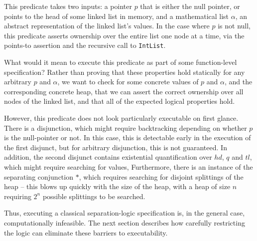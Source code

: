 This predicate takes two inputs: a pointer $p$ that is either the null pointer, or points to the head of some linked list in memory, and a mathematical list $\alpha$, an abstract representation of the linked list's values. In the case where $p$ is not null, this predicate asserts ownership over the entire list one node at a time, via the points-to assertion and the recursive call to \texttt{IntList}.

What would it mean to execute this predicate as part of some function-level specification? Rather than proving that these properties hold statically for any arbitrary $p$ and $\alpha$, we want to check for some concrete values of $p$ and $\alpha$, and the corresponding concrete heap, that we can assert the correct ownership over all nodes of the linked list, and that all of the expected logical properties hold. 

However, this predicate does not look particularly executable on first glance. There is a disjunction, which might require backtracking depending on whether $p$ is the null-pointer or not. In this case, this is detectable early in the execution of the first disjunct, but for arbitrary disjunction, this is not guaranteed. In addition, the second disjunct contains existential quantification over ${hd}$, $q$ and ${tl}$, which might require searching for values, Furthermore, there is an instance of the separating conjunction $\ast$, which requires searching for disjoint splittings of the heap -- this blows up quickly with the size of the heap, with a heap of size $n$ requiring $2^n$ possible splittings to be searched.

Thus, executing a classical separation-logic specification is, in the general case, computationally infeasible. The next section describes how carefully restricting the logic can eliminate these barriers to executability.


